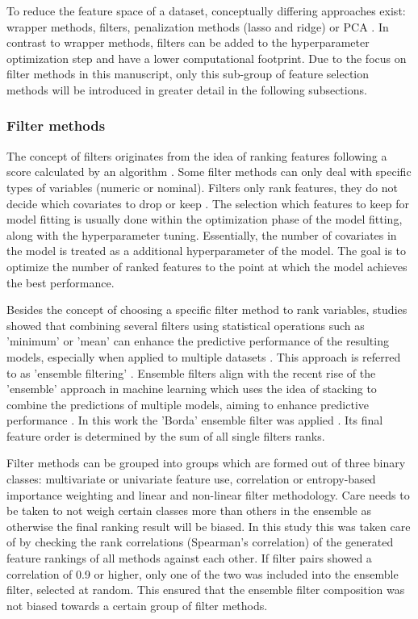 \documentclass[peerreview]{IEEEtran}
\begin{document}
To reduce the feature space of a dataset, conceptually differing approaches exist: wrapper methods, filters, penalization methods (lasso and ridge) or \ac{PCA} \cite{bommert2020, das2001, guyon2003, jolliffe2016}.
In contrast to wrapper methods, filters can be added to the hyperparameter optimization step and have a lower computational footprint.
Due to the focus on filter methods in this manuscript, only this sub-group of feature selection methods will be introduced in greater detail in the following subsections.

\subsubsection{Filter methods}

The concept of filters originates from the idea of ranking features following a score calculated by an algorithm \cite{guyon2003}.
Some filter methods can only deal with specific types of variables (numeric or nominal).
Filters only rank features, they do not decide which covariates to drop or keep \cite{drotar2015}.
The selection which features to keep for model fitting is usually done within the optimization phase of the model fitting, along with the hyperparameter tuning.
Essentially, the number of covariates in the model is treated as a additional hyperparameter of the model.
The goal is to optimize the number of ranked features to the point at which the model achieves the best performance.

Besides the concept of choosing a specific filter method to rank variables, studies showed that combining several filters using statistical operations such as 'minimum' or 'mean' can enhance the predictive performance of the resulting models, especially when applied to multiple datasets \cite{abeel2010, drotar2017a}.
This approach is referred to as 'ensemble filtering' \cite{dietterich2000}.
Ensemble filters align with the recent rise of the 'ensemble' approach in machine learning which uses the idea of stacking to combine the predictions of multiple models, aiming to enhance predictive performance \cite{polikar2012, feurer2015, bolon-canedo2019}.
In this work the 'Borda' ensemble filter was applied \cite{drotar2017a}.
Its final feature order is determined by the sum of all single filters ranks.

Filter methods can be grouped into groups which are formed out of three binary classes: multivariate or univariate feature use, correlation or entropy-based importance weighting and linear and non-linear filter methodology.
Care needs to be taken to not weigh certain classes more than others in the ensemble as otherwise the final ranking result will be biased.
In this study this was taken care of by checking the rank correlations (Spearman's correlation) of the generated feature rankings of all methods against each other.
If filter pairs showed a correlation of 0.9 or higher, only one of the two was included into the ensemble filter, selected at random.
This ensured that the ensemble filter composition was not biased towards a certain group of filter methods.
\end{document}
